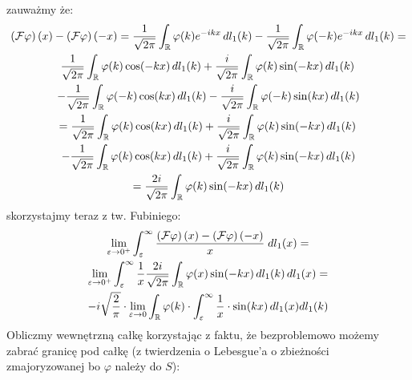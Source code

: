\documentclass[11pt]{scrartcl}
\begin{document}
\begin{walk}
            zauważmy że:
            \begin{gather*}
                \left ( \mathcal{F} \varphi  \right ) (x) - \left ( \mathcal{F} \varphi \right ) (-x) =
                \frac{1}{\sqrt{2 \pi } } \int_{\mathbb R} \varphi (k) e^{-ikx} \, dl_1 (k) - 
                \frac{1}{\sqrt{2 \pi } } \int_{\mathbb R} \varphi (-k) e^{-ikx} \, dl_1 (k) = 
                \\
                \frac{1}{\sqrt{2 \pi } } \int_{\mathbb R} \varphi (k) \cos (-kx) \, dl_1 (k) + 
                \frac{i}{\sqrt{2 \pi } } \int_{\mathbb R} \varphi (k) \sin (-kx) \, dl_1 (k) \, \\ - 
                \frac{1}{\sqrt{2 \pi } } \int_{\mathbb R} \varphi (-k) \cos (kx) \, dl_1 (k) -
                \frac{i}{\sqrt{2 \pi } } \int_{\mathbb R} \varphi (-k) \sin (kx) \, dl_1 (k) \\ = 
                \frac{1}{\sqrt{2 \pi } } \int_{\mathbb R} \varphi (k) \cos (kx) \, dl_1 (k) + 
                \frac{i}{\sqrt{2 \pi } } \int_{\mathbb R} \varphi (k) \sin (-kx) \, dl_1 (k) \, \\ - 
                \frac{1}{\sqrt{2 \pi } } \int_{\mathbb R} \varphi (k) \cos (kx) \, dl_1 (k) +
                \frac{i}{\sqrt{2 \pi } } \int_{\mathbb R} \varphi (k) \sin (-kx) \, dl_1 (k) \\ = 
                \frac{2i}{\sqrt{2 \pi } } \int_{\mathbb R} \varphi (k) \sin (-kx) \, dl_1 (k)
            \end{gather*}
            skorzystajmy teraz z tw. Fubiniego:
            \begin{gather*}
                \lim_{\varepsilon \to 0^+} \int_{\varepsilon}^{\infty}
                    \frac{ 
                        \left ( \mathcal{F} \varphi  \right ) (x) - 
                        \left ( \mathcal{F} \varphi \right ) (-x) 
                    }{x} \; dl_1 (x) = \\
                \lim_{\varepsilon \to 0^+} \int_{\varepsilon}^{\infty} \frac{1}{x}
                    \frac{2i}{\sqrt{2 \pi } } \int_{\mathbb R} \varphi (x) \sin (-kx) \, dl_1 (k) \, dl_1 (x) = \\
                    -i \sqrt{\frac{2}{\pi}} \cdot \lim_{\varepsilon \to 0} \int_{\mathbb R} \varphi (k) \cdot 
                    \int_{\varepsilon}^{\infty } \frac{1}{x} \cdot \sin (kx) \, dl_1 (x) dl_1(k)
            \end{gather*}
            Obliczmy wewnętrzną całkę korzystając z faktu, że bezproblemowo możemy 
            zabrać granicę pod całkę (z twierdzenia o Lebesgue'a o zbieżności zmajoryzowanej 
            bo $\varphi$ należy do $S$):

\end{walk}
\end{document}

